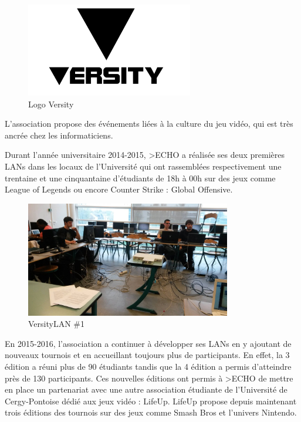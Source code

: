             \begin{figure}[ht]
                \centering
                \includegraphics[width=0.65\textwidth]{images/logo_versity.jpg}
                \caption{Logo Versity}
            \end{figure}
        
            L'association propose des événements liées à la culture du jeu vidéo, qui est très ancrée chez les informaticiens. 
            
            Durant l'année universitaire 2014-2015, >ECHO a réalisée ses deux premières LANs dans les locaux de l'Université qui ont rassemblées respectivement une trentaine et une cinquantaine d'étudiants de 18h à 00h sur des jeux comme League of Legends ou encore Counter Strike : Global Offensive.
            
            \begin{figure}[ht]
                \centering
                \includegraphics[width=0.8\textwidth]{images/versity1.jpg}
                \caption{VersityLAN \#1}
            \end{figure}
            
            En 2015-2016, l'association a continuer à développer ses LANs en y ajoutant de nouveaux tournois et en accueillant toujours plus de participants. En effet, la 3 édition a réuni plus de 90 étudiants tandis que la 4 édition a permis d'atteindre près de 130 participants.
            Ces nouvelles éditions ont permis à >ECHO de mettre en place un partenariat avec une autre association étudiante de l'Université de Cergy-Pontoise dédié aux jeux vidéo : LifeUp. LifeUp propose depuis maintenant trois éditions des tournois sur des jeux comme Smash Bros et l'univers Nintendo.
            
